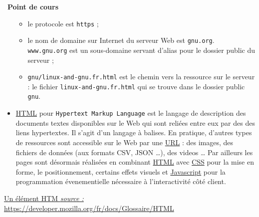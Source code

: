 \documentclass[
  11pt,
]{article}
\newcommand{\passthrough}[1]{#1}
\providecommand{\tightlist}{%
  \setlength{\itemsep}{0pt}\setlength{\parskip}{0pt}}
\newcounter{cours}
\newenvironment{cours}[1]
{\par \medskip   \addtocounter{cours}{1} \noindent  
\begin{bclogo}[arrondi =0.1,  ombre = true, barre=none, logo=\bcbook, marge=4]{~\textbf{Point de cours} \textbf{\thecours} {\itshape #1} }  \par}
{
\end{bclogo}
 \par \bigskip }
\newcounter{prog}
\begin{document}
\begin{cours}{}
\begin{itemize}
  \begin{itemize}
  \tightlist
  \item
    le protocole est \passthrough{\lstinline!https!} ;
  \item
    le nom de domaine sur Internet du serveur Web est
    \passthrough{\lstinline!gnu.org!}.\\
    \passthrough{\lstinline!www.gnu.org!} est un sous-domaine servant
    d'alias pour le dossier public du serveur ;
  \item
    \passthrough{\lstinline!gnu/linux-and-gnu.fr.html!} est le chemin
    vers la ressource sur le serveur : le fichier
    \passthrough{\lstinline!linux-and-gnu.fr.html!} qui se trouve dans
    le dossier public \passthrough{\lstinline!gnu!}.
  \end{itemize}
\item
  \href{https://developer.mozilla.org/fr/docs/Glossaire/HTML}{HTML} pour
  \passthrough{\lstinline!Hypertext Markup Language!} est le langage de
  description des documents textes disponibles sur le Web qui sont
  reliées entre eux par des des liens hypertextes. Il s'agit d'un
  langage à balises. En pratique, d'autres types de ressources sont
  accessible sur le Web par une
  \href{https://developer.mozilla.org/fr/docs/Glossaire/URL}{URL} : des
  images, des fichiers de données (aux formats CSV, JSON \ldots), des
  videos \ldots{} Par ailleurs les pages sont désormais réalisées en
  combinant
  \href{https://developer.mozilla.org/fr/docs/Glossaire/HTML}{HTML} avec
  \href{https://developer.mozilla.org/fr/docs/Glossaire/CSS}{CSS} pour
  la mise en forme, le positionnement, certains effets visuels et
  \href{https://developer.mozilla.org/fr/docs/Glossaire/JavaScript}{Javascript}
  pour la programmation évenementielle nécessaire à l'interactivité côté
  client.
\end{itemize}

\href{images/anatomie-element-html.png}{Un élément HTM \emph{source :}
https://developer.mozilla.org/fr/docs/Glossaire/HTML}\\

\end{cours}
\end{document}
